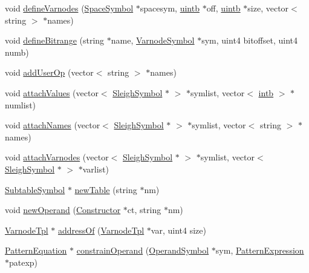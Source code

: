 \begin{DoxyCompactItemize}
void \mbox{\hyperlink{class_sleigh_compile_a97fb4d4cb94d8de8eaba37c0aac16bce}{define\+Varnodes}} (\mbox{\hyperlink{class_space_symbol}{Space\+Symbol}} $\ast$spacesym, \mbox{\hyperlink{types_8h_a2db313c5d32a12b01d26ac9b3bca178f}{uintb}} $\ast$off, \mbox{\hyperlink{types_8h_a2db313c5d32a12b01d26ac9b3bca178f}{uintb}} $\ast$size, vector$<$ string $>$ $\ast$names)
\item 
void \mbox{\hyperlink{class_sleigh_compile_a5bab7ee59435857526ed02fd3071f4d7}{define\+Bitrange}} (string $\ast$name, \mbox{\hyperlink{class_varnode_symbol}{Varnode\+Symbol}} $\ast$sym, uint4 bitoffset, uint4 numb)
\item 
void \mbox{\hyperlink{class_sleigh_compile_ab5e2aa6387dbb75df28a3418665cdd51}{add\+User\+Op}} (vector$<$ string $>$ $\ast$names)
\item 
void \mbox{\hyperlink{class_sleigh_compile_aaa65f4c8bab6da49b695e36808ee6724}{attach\+Values}} (vector$<$ \mbox{\hyperlink{class_sleigh_symbol}{Sleigh\+Symbol}} $\ast$ $>$ $\ast$symlist, vector$<$ \mbox{\hyperlink{types_8h_aa925ba3e627c2df89d5b1cfe84fb8572}{intb}} $>$ $\ast$numlist)
\item 
void \mbox{\hyperlink{class_sleigh_compile_aeb453f70cf88dfa1459a859c5d3ef551}{attach\+Names}} (vector$<$ \mbox{\hyperlink{class_sleigh_symbol}{Sleigh\+Symbol}} $\ast$ $>$ $\ast$symlist, vector$<$ string $>$ $\ast$names)
\item 
void \mbox{\hyperlink{class_sleigh_compile_a3bf9c02ba7c649ca151116c181817555}{attach\+Varnodes}} (vector$<$ \mbox{\hyperlink{class_sleigh_symbol}{Sleigh\+Symbol}} $\ast$ $>$ $\ast$symlist, vector$<$ \mbox{\hyperlink{class_sleigh_symbol}{Sleigh\+Symbol}} $\ast$ $>$ $\ast$varlist)
\item 
\mbox{\hyperlink{class_subtable_symbol}{Subtable\+Symbol}} $\ast$ \mbox{\hyperlink{class_sleigh_compile_a6a59f980ee7792e983275d1cb3913ba2}{new\+Table}} (string $\ast$nm)
\item 
void \mbox{\hyperlink{class_sleigh_compile_a012c6e9fcecbbbaeea20a1e7cbe38e9d}{new\+Operand}} (\mbox{\hyperlink{class_constructor}{Constructor}} $\ast$ct, string $\ast$nm)
\item 
\mbox{\hyperlink{class_varnode_tpl}{Varnode\+Tpl}} $\ast$ \mbox{\hyperlink{class_sleigh_compile_a5c736771ead9a6bec61df50946f98de8}{address\+Of}} (\mbox{\hyperlink{class_varnode_tpl}{Varnode\+Tpl}} $\ast$var, uint4 size)
\item 
\mbox{\hyperlink{class_pattern_equation}{Pattern\+Equation}} $\ast$ \mbox{\hyperlink{class_sleigh_compile_af726f70a39e1b7e9a7695f7fcae7523e}{constrain\+Operand}} (\mbox{\hyperlink{class_operand_symbol}{Operand\+Symbol}} $\ast$sym, \mbox{\hyperlink{class_pattern_expression}{Pattern\+Expression}} $\ast$patexp)

\end{DoxyCompactItemize}
